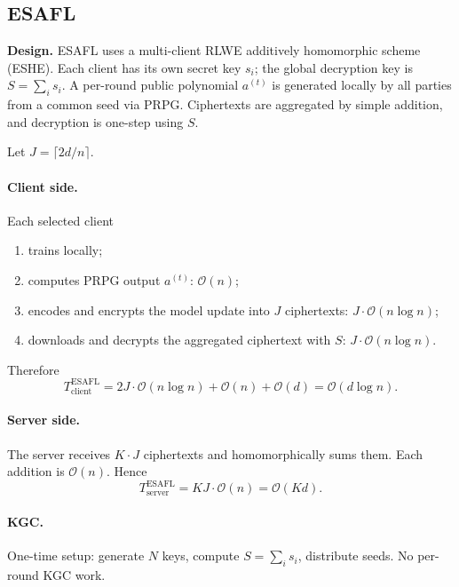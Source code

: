 \documentclass[a4paper,11pt]{article}
\begin{document}
\subsection{ESAFL}
\label{ssec:esafl}

\textbf{Design.} ESAFL uses a multi-client RLWE additively homomorphic scheme (ESHE). Each client has its own secret key $s_i$; the global decryption key is $S=\sum_i s_i$. A per-round public polynomial $a^{(t)}$ is generated locally by all parties from a common seed via PRPG. Ciphertexts are aggregated by simple addition, and decryption is one-step using $S$.

Let $J=\lceil 2d/n\rceil$.

\paragraph{Client side.} Each selected client
\begin{enumerate}
    \item trains locally;
    \item computes PRPG output $a^{(t)}$: $\mathcal{O}(n)$;
    \item encodes and encrypts the model update into $J$ ciphertexts: $J\cdot\mathcal{O}(n\log n)$;
    \item downloads and decrypts the aggregated ciphertext with $S$: $J\cdot\mathcal{O}(n\log n)$.
\end{enumerate}
Therefore
\begin{equation}
\boxed{T_{\text{client}}^{\text{ESAFL}} = 2J\cdot\mathcal{O}(n\log n) + \mathcal{O}(n) + \mathcal{O}(d) = \mathcal{O}(d\log n).}
\end{equation}

\paragraph{Server side.} The server receives $K\cdot J$ ciphertexts and homomorphically sums them. Each addition is $\mathcal{O}(n)$. Hence
\begin{equation}
\boxed{T_{\text{server}}^{\text{ESAFL}} = KJ\cdot\mathcal{O}(n) = \mathcal{O}(Kd).}
\end{equation}

\paragraph{KGC.} One-time setup: generate $N$ keys, compute $S=\sum_i s_i$, distribute seeds. No per-round KGC work.
\end{document}
